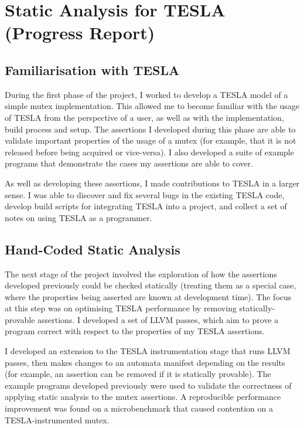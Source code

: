 \documentclass[a4paper]{article}
\begin{document}

\section*{Static Analysis for TESLA (Progress Report)}

\subsection*{Familiarisation with TESLA}

During the first phase of the project, I worked to develop a TESLA model of a
simple mutex implementation. This allowed me to become familiar with the usage
of TESLA from the perspective of a user, as well as with the implementation,
build process and setup. The assertions I developed during this phase are able
to validate important properties of the usage of a mutex (for example, that it
is not released before being acquired or vice-versa). I also developed a suite
of example programs that demonstrate the cases my assertions are able to cover.

As well as developing these assertions, I made contributions to TESLA in a
larger sense. I was able to discover and fix several bugs in the existing TESLA
code, develop build scripts for integrating TESLA into a project, and collect a
set of notes on using TESLA as a programmer.

\subsection*{Hand-Coded Static Analysis}

The next stage of the project involved the exploration of how the assertions
developed previously could be checked statically (treating them as a special
case, where the properties being asserted are known at development time). The
focus at this step was on optimising TESLA performance by removing
statically-provable assertions. I developed a set of LLVM passes, which aim to
prove a program correct with respect to the properties of my TESLA assertions.

I developed an extension to the TESLA instrumentation stage that runs LLVM
passes, then makes changes to an automata manifest depending on the results (for
example, an assertion can be removed if it is statically provable). The example
programs developed previously were used to validate the correctness of applying
static analysis to the mutex assertions. A reproducible performance improvement
was found on a microbenchmark that caused contention on a TESLA-instrumented
mutex.
\end{document}
